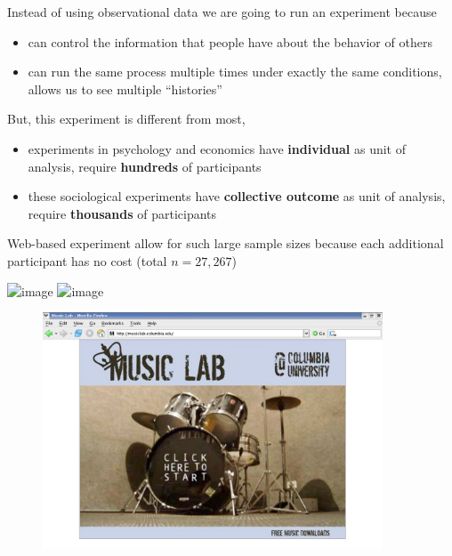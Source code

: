 \documentclass[aspectratio=169]{beamer}
\begin{document}
\begin{frame}

Instead of using observational data we are going to run an experiment because
\begin{itemize}
\item can control the information that people have about the behavior of others
\pause
\item can run the same process multiple times under exactly the same conditions, allows us to see multiple ``histories''
\end{itemize}

\vspace{0.2in}
But, this experiment is different from most,
\begin{itemize}
\item experiments in psychology and economics have \textbf{individual}
as unit of analysis, require \textbf{hundreds} of participants 
\item these sociological experiments have \textbf{collective outcome}
as unit of analysis, require \textbf{thousands} of participants
\end{itemize}
Web-based experiment allow for such large sample sizes because each additional participant has no cost (total $n= 27,267$)\\

\end{frame}
\begin{frame}

\begin{center}
\includegraphics<1>[width = 0.85\textwidth]{figures/zero_variable_cost_1}
\includegraphics<2>[width = 0.85\textwidth]{figures/zero_variable_cost_2}
\end{center}

\end{frame}
\begin{frame}

\begin{figure}
  \centering
  \includegraphics[width = 0.9\textwidth]{figures/splashscreen}
\end{figure}

\end{frame}
\end{document}
